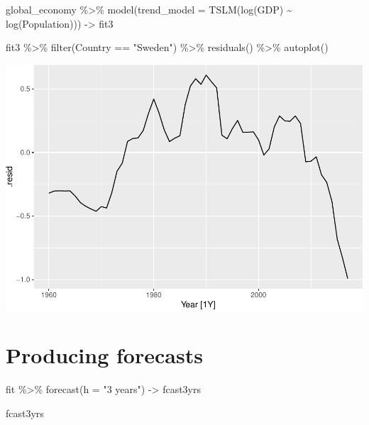 \documentclass[
]{book}
\newenvironment{Shaded}{\begin{snugshade}}{\end{snugshade}}
\newcommand{\AttributeTok}[1]{\textcolor[rgb]{0.77,0.63,0.00}{#1}}
\newcommand{\FunctionTok}[1]{\textcolor[rgb]{0.00,0.00,0.00}{#1}}
\newcommand{\NormalTok}[1]{#1}
\newcommand{\OtherTok}[1]{\textcolor[rgb]{0.56,0.35,0.01}{#1}}
\newcommand{\SpecialCharTok}[1]{\textcolor[rgb]{0.00,0.00,0.00}{#1}}
\newcommand{\StringTok}[1]{\textcolor[rgb]{0.31,0.60,0.02}{#1}}
\begin{document}
\begin{Shaded}
\begin{Highlighting}[]
\NormalTok{global\_economy }\SpecialCharTok{\%\textgreater{}\%} \FunctionTok{model}\NormalTok{(}\AttributeTok{trend\_model =} \FunctionTok{TSLM}\NormalTok{(}\FunctionTok{log}\NormalTok{(GDP) }\SpecialCharTok{\textasciitilde{}} \FunctionTok{log}\NormalTok{(Population))) }\OtherTok{{-}\textgreater{}}\NormalTok{ fit3}

\NormalTok{fit3 }\SpecialCharTok{\%\textgreater{}\%} \FunctionTok{filter}\NormalTok{(Country }\SpecialCharTok{==} \StringTok{"Sweden"}\NormalTok{) }\SpecialCharTok{\%\textgreater{}\%} \FunctionTok{residuals}\NormalTok{() }\SpecialCharTok{\%\textgreater{}\%} \FunctionTok{autoplot}\NormalTok{()}
\end{Highlighting}
\end{Shaded}

\includegraphics{graphics/unnamed-chunk-31-1.pdf}

\hypertarget{producing-forecasts}{%
\section{Producing forecasts}\label{producing-forecasts}}

\begin{Shaded}
\begin{Highlighting}[]
\NormalTok{fit }\SpecialCharTok{\%\textgreater{}\%} \FunctionTok{forecast}\NormalTok{(}\AttributeTok{h =} \StringTok{"3 years"}\NormalTok{) }\OtherTok{{-}\textgreater{}}\NormalTok{ fcast3yrs}

\NormalTok{fcast3yrs}
\end{Highlighting}
\end{Shaded}
\end{document}

